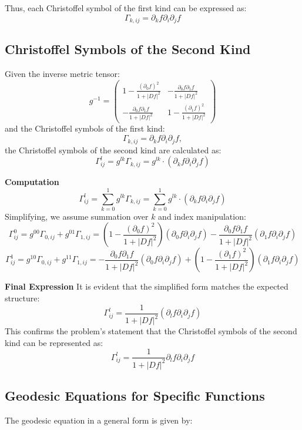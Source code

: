 \documentclass{article}
\begin{document}
Thus, each Christoffel symbol of the first kind can be expressed as:
\[
\Gamma_{k,ij} = \partial_k f \partial_i \partial_j f
\]

\subsection{Christoffel Symbols of the Second Kind}

Given the inverse metric tensor:
\[
g^{-1} = \begin{pmatrix}
1 - \frac{(\partial_0 f)^2}{1 + |Df|^2} & -\frac{\partial_0 f \partial_1 f}{1 + |Df|^2} \\
-\frac{\partial_0 f \partial_1 f}{1 + |Df|^2} & 1 - \frac{(\partial_1 f)^2}{1 + |Df|^2}
\end{pmatrix}
\]
and the Christoffel symbols of the first kind:
\[
\Gamma_{k,ij} = \partial_k f \partial_i \partial_j f,
\]
the Christoffel symbols of the second kind are calculated as:
\[
\Gamma^l_{ij} = g^{lk} \Gamma_{k,ij} = g^{lk} \cdot (\partial_k f \partial_i \partial_j f)
\]

\textbf{Computation}
\[
\Gamma^l_{ij} = \sum_{k=0}^1 g^{lk} \Gamma_{k,ij} = \sum_{k=0}^1 g^{lk} \cdot (\partial_k f \partial_i \partial_j f)
\]
Simplifying, we assume summation over \(k\) and index manipulation:
\[
\Gamma^0_{ij} = g^{00} \Gamma_{0,ij} + g^{01} \Gamma_{1,ij} = \left(1 - \frac{(\partial_0 f)^2}{1 + |Df|^2}\right)(\partial_0 f \partial_i \partial_j f) - \frac{\partial_0 f \partial_1 f}{1 + |Df|^2} (\partial_1 f \partial_i \partial_j f)
\]
\[
\Gamma^1_{ij} = g^{10} \Gamma_{0,ij} + g^{11} \Gamma_{1,ij} = -\frac{\partial_0 f \partial_1 f}{1 + |Df|^2} (\partial_0 f \partial_i \partial_j f) + \left(1 - \frac{(\partial_1 f)^2}{1 + |Df|^2}\right)(\partial_1 f \partial_i \partial_j f)
\]

\textbf{Final Expression}
It is evident that the simplified form matches the expected structure:
\[
\Gamma^l_{ij} = \frac{1}{1 + |Df|^2} (\partial_l f \partial_i \partial_j f)
\]
This confirms the problem's statement that the Christoffel symbols of the second kind can be represented as:
\[
\Gamma^l_{ij} = \frac{1}{1 + |Df|^2} \partial_l f \partial_i \partial_j f
\]

\subsection{Geodesic Equations for Specific Functions}

The geodesic equation in a general form is given by:
\end{document}
